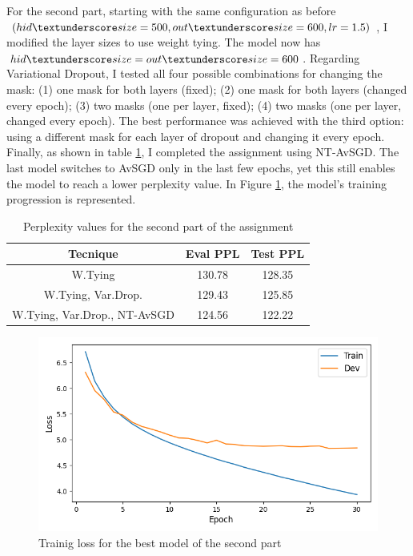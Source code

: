 \documentclass[a4paper]{article}
\begin{document}
For the second part, starting with the same configuration as before \((hid \textunderscore size=500, out \textunderscore size=600, lr=1.5)\), I modified the layer sizes to use weight tying.
The model now has \(hid \textunderscore size=out \textunderscore size=600\).
Regarding Variational Dropout, I tested all four possible combinations for changing the mask: (1) one mask for both layers (fixed); (2) one mask for both layers (changed every epoch); (3) two masks (one per layer, fixed); (4) two masks (one per layer, changed every epoch). The best performance was achieved with the third option: using a different mask for each layer of dropout and changing it every epoch.
Finally, as shown in table \ref{tab:results2}, I completed the assignment using NT-AvSGD.
The last model switches to AvSGD only in the last few epochs, yet this still enables the model to reach a lower perplexity value.
In Figure \ref{fig:fig2}, the model's training progression is represented.

\begin{table}[h]
  \centering
  \begin{tabular}{|c|c|c|}
    \hline
    \textbf{Tecnique} & \textbf{Eval PPL} & \textbf{Test PPL} \\
    \hline
    W.Tying & 130.78 & 128.35 \\
    W.Tying, Var.Drop. & 129.43 & 125.85 \\
    W.Tying, Var.Drop., NT-AvSGD & 124.56 & 122.22 \\
    \hline
  \end{tabular}
  \caption{Perplexity values for the second part of the assignment}
  \label{tab:results2}

\end{table}

\begin{figure}[h]
  \includegraphics[width=\linewidth]{./images/plot_2_loss.png}
  \caption{Trainig loss for the best model of the second part}
  \label{fig:fig2}
\end{figure}





\end{document}
